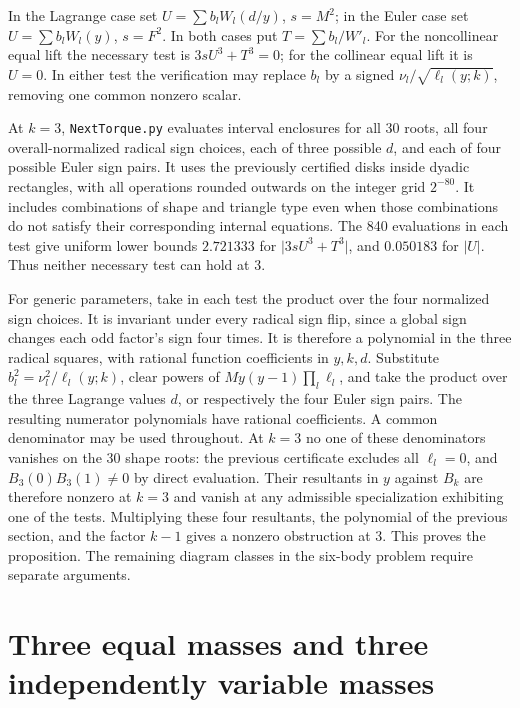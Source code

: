 \documentclass[11pt]{article}
\begin{document}
In the Lagrange case set \(U=\sum b_l W_l(d/y)\), \(s=M^2\); in the
Euler case set \(U=\sum b_l W_l(y)\), \(s=F^2\). In both cases put
\(T=\sum b_l/W'_l\).
For the noncollinear equal lift the necessary test is \(3s U^3+T^3=0\);
for the collinear equal lift it is \(U=0\).
In either test the verification may replace \(b_l\) by a signed
\(\nu_l/\sqrt{\ell_l(y;k)}\), removing one common nonzero scalar.

At \(k=3\), \texttt{NextTorque.py} evaluates interval enclosures for
all 30 roots, all four overall-normalized radical sign choices, each
of three possible \(d\), and each of four possible Euler sign pairs.
It uses the previously certified disks inside dyadic rectangles, with
all operations rounded outwards on the integer grid \(2^{-80}\).
It includes combinations of shape and triangle type even when those
combinations do not satisfy their corresponding internal equations.
The 840 evaluations in each test give uniform lower bounds
\(2.721333\) for \(\lvert 3sU^3+T^3\rvert\), and \(0.050183\) for
\(\lvert U\rvert\). Thus neither necessary test can hold at \(3\).

For generic parameters, take in each test the product over the four
normalized sign choices. It is invariant under every radical sign
flip, since a global sign changes each odd factor's sign four times.
It is therefore a polynomial in the three radical squares, with rational
function coefficients in \(y,k,d\). Substitute
\(b_l^2=\nu_l^2/\ell_l(y;k)\), clear powers of
\(M y(y-1)\prod_l\ell_l\), and take the product over the three
Lagrange values \(d\), or respectively the four Euler sign pairs.
The resulting numerator polynomials have rational coefficients.
A common denominator may be used throughout. At \(k=3\) no one
of these denominators vanishes on the 30 shape roots: the previous
certificate excludes all \(\ell_l=0\), and \(B_3(0)B_3(1)\ne0\)
by direct evaluation. Their resultants in \(y\) against \(B_k\)
are therefore nonzero at \(k=3\) and vanish at any admissible
specialization exhibiting one of the tests. Multiplying these four
resultants, the polynomial of the previous section, and the factor
\(k-1\) gives a nonzero obstruction at 3. This proves the proposition.
The remaining diagram classes in the six-body problem require separate
arguments.

\section{Three equal masses and three independently variable masses}
\end{document}
